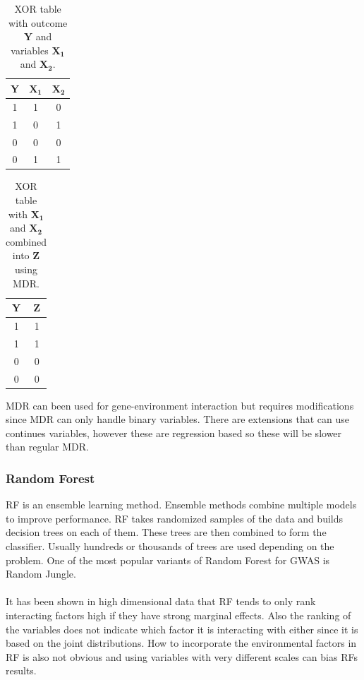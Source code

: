 \documentclass[10pt,a4paper]{report}
\begin{document}
\begin{table}[h]
\begin{tabular}{ | c | c | c | }
  \hline
  \textbf{Y} & $\mathbf{X_1}$ & $\mathbf{X_2}$ \\
  \hline
  1 & 1 & 0 \\
  \hline 
  1 & 0 & 1 \\
  \hline
  0 & 0 & 0 \\
  \hline
  0 & 1 & 1 \\
  \hline
\end{tabular}
\caption{XOR table with outcome $\mathbf{Y}$ and variables $\mathbf{X_1}$ and $\mathbf{X_2}$.}
\label{table:xor_table}
\end{table}
\begin{table}[h]
\begin{tabular}{ | c | c | }
  \hline
  \textbf{Y} & \textbf{Z} \\
  \hline
  1 & 1 \\
  \hline
  1 & 1 \\
  \hline
  0 & 0 \\
  \hline
  0 & 0 \\
  \hline
\end{tabular}
\caption{XOR table with $\mathbf{X_1}$ and $\mathbf{X_2}$ combined into $\mathbf{Z}$ using MDR.}
\label{table:xor_mdr_table}
\end{table}

MDR can been used for gene-environment interaction but requires modifications since MDR can only handle binary variables. There are extensions that can use continues variables, however these are regression based so these will be slower than regular MDR.\cite{gene_enviroment_2013}

\subsubsection{Random Forest}
RF is an ensemble learning method\cite{random_forest}. Ensemble methods combine multiple models to improve performance. RF takes randomized samples of the data and builds decision trees on each of them. These trees are then combined to form the classifier. Usually hundreds or thousands of trees are used depending on the problem\cite{random_forest}. One of the most popular variants of Random Forest for GWAS is Random Jungle\cite{random_jungle}.\\
\\
It has been shown in high dimensional data that RF tends to only rank interacting factors high if they have strong marginal effects\cite{winham_rf_2012}. Also the ranking of the variables does not indicate which factor it is interacting with either since it is based on the joint distributions\cite{gene_enviroment_2013}. How to incorporate the environmental factors in RF is also not obvious and using variables with very different scales can bias RFs results\cite{gene_enviroment_2013}.
\end{document}
